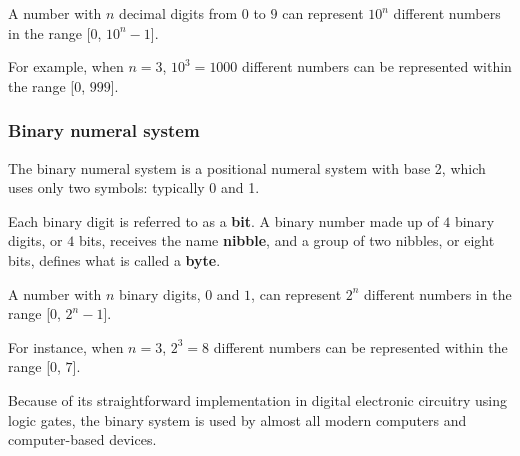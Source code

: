 \begin{proposition}
    A number with $n$ decimal digits from $0$ to $9$ can represent $10^n$ different numbers in the range [$0$, $10^n - 1$].
\end{proposition}

For example, when $n = 3$, $10^3 = 1000$ different numbers can be represented within the range [$0$, $999$].

\subsubsection{Binary numeral system}
\begin{definition}
    The binary numeral system is a positional numeral system with base 2, which uses only two symbols: typically 0 and 1.
\end{definition}


Each binary digit is referred to as a \textbf{bit}. A binary number made up of $4$ binary digits, or $4$ bits, receives the name \textbf{nibble}, and a group of two nibbles, or eight bits, defines what is called a \textbf{byte}.

\begin{proposition}
    A number with $n$ binary digits, $0$ and $1$, can represent $2^n$ different numbers in the range [$0$, $2^n - 1$].
\end{proposition}

For instance, when $n = 3$, $2^3 = 8$ different numbers can be represented within the range [$0$, $7$].

Because of its straightforward implementation in digital electronic circuitry using logic gates, the binary system is used by almost all modern computers and computer-based devices.

